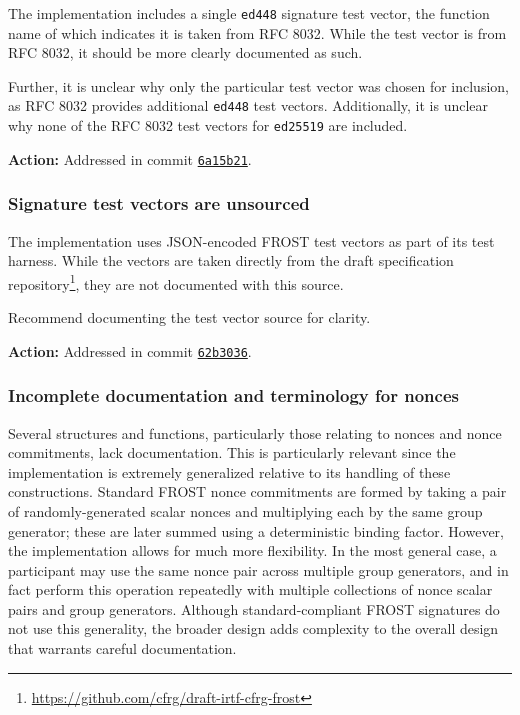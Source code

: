 \documentclass{article}
\begin{document}
The implementation includes a single \texttt{ed448} signature test vector, the function name of which indicates it is taken from RFC 8032.
While the test vector is from RFC 8032, it should be more clearly documented as such.

Further, it is unclear why only the particular test vector was chosen for inclusion, as RFC 8032 provides additional \texttt{ed448} test vectors.
Additionally, it is unclear why none of the RFC 8032 test vectors for \texttt{ed25519} are included.

\textbf{Action:} Addressed in commit \href{https://github.com/serai-dex/serai/commit/6a15b21949e7ca7a177d7c06a7ae65ddda2429c1}{\texttt{6a15b21}}.


\subsubsection{Signature test vectors are unsourced}

The implementation uses JSON-encoded FROST test vectors as part of its test harness.
While the vectors are taken directly from the draft specification repository\footnote{\url{https://github.com/cfrg/draft-irtf-cfrg-frost}}, they are not documented with this source.

Recommend documenting the test vector source for clarity.

\textbf{Action:} Addressed in commit \href{https://github.com/serai-dex/serai/commit/62b3036cbd3d0fc9d024fde5b377567db6b90d53}{\texttt{62b3036}}.


\subsubsection{Incomplete documentation and terminology for nonces}

Several structures and functions, particularly those relating to nonces and nonce commitments, lack documentation.
This is particularly relevant since the implementation is extremely generalized relative to its handling of these constructions.
Standard FROST nonce commitments are formed by taking a pair of randomly-generated scalar nonces and multiplying each by the same group generator; these are later summed using a deterministic binding factor.
However, the implementation allows for much more flexibility.
In the most general case, a participant may use the same nonce pair across multiple group generators, and in fact perform this operation repeatedly with multiple collections of nonce scalar pairs and group generators.
Although standard-compliant FROST signatures do not use this generality, the broader design adds complexity to the overall design that warrants careful documentation.
\end{document}
